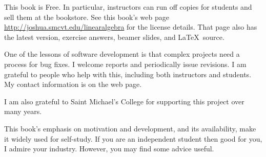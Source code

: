 {\medskip
{}
This book is Free.
In particular, instructors can run off copies for students 
and sell them at the bookstore.
See this book's web page 
\url{http://joshua.smcvt.edu/linearalgebra}
for the license details.
That page also has the latest version, 
exercise answers, beamer slides,
and \LaTeX\ source.



\medskip
{}
One of the lessons of software
development is that complex projects need a process for bug fixes.
I welcome reports and 
periodically issue revisions.
I am grateful to people who help with this,
including both instructors and students. 
My contact information is on the web page.

I am also grateful to Saint Michael's College 
for supporting this project over many years.




\newcommand{\classday}[1]{\textsc{#1}}
\newcommand{\colwidth}{1.25in}

\medskip
{}
%
This book's emphasis on motivation and development,
and its availability, make it widely used for self-study.
If you are an independent student then good for you, I admire your industry.
However, you may find some advice useful.

}

